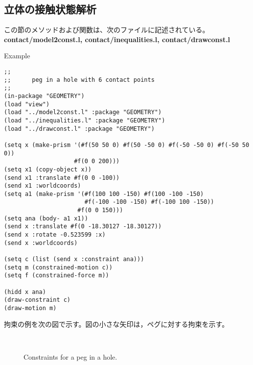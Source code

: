 \subsection{\label{Contact}立体の接触状態解析}

この節のメソッドおよび関数は、次のファイルに記述されている。
{\bf contact/model2const.l, con\-tact/in\-e\-qual\-i\-ties.l, contact/drawconst.l}

\begin{refdesc}




\end{refdesc}
Example\\
\begin{verbatim}
;;
;;      peg in a hole with 6 contact points
;;
(in-package "GEOMETRY")
(load "view")
(load "../model2const.l" :package "GEOMETRY")
(load "../inequalities.l" :package "GEOMETRY")
(load "../drawconst.l" :package "GEOMETRY")

(setq x (make-prism '(#f(50 50 0) #f(50 -50 0) #f(-50 -50 0) #f(-50 50 0))
                    #f(0 0 200)))
(setq x1 (copy-object x))
(send x1 :translate #f(0 0 -100))
(send x1 :worldcoords)
(setq a1 (make-prism '(#f(100 100 -150) #f(100 -100 -150)
                       #f(-100 -100 -150) #f(-100 100 -150))
                     #f(0 0 150)))
(setq ana (body- a1 x1))
(send x :translate #f(0 -18.30127 -18.30127))
(send x :rotate -0.523599 :x)
(send x :worldcoords)

(setq c (list (send x :constraint ana)))
(setq m (constrained-motion c))
(setq f (constrained-force m))

(hidd x ana)
(draw-constraint c)
(draw-motion m)
\end{verbatim}
\clearpage
拘束の例を次の図で示す。図の小さな矢印は，ペグに対する拘束を示す。
\\
\begin{figure}[h]
\\
\caption{Constraints for a peg in a hole.}
\label{fig:peg-in-hole}
\end{figure}
